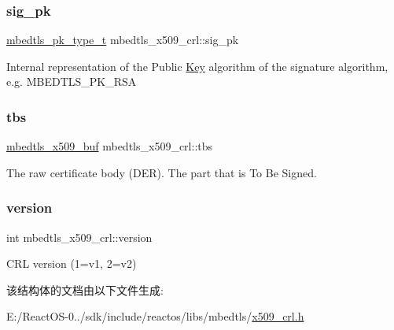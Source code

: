 \subsubsection{\texorpdfstring{sig\+\_\+pk}{sig\_pk}}
{\footnotesize\ttfamily \hyperlink{pk_8h_a3fe41eff5605ae727eb9d28dad297020}{mbedtls\+\_\+pk\+\_\+type\+\_\+t} mbedtls\+\_\+x509\+\_\+crl\+::sig\+\_\+pk}

Internal representation of the Public \hyperlink{struct_key}{Key} algorithm of the signature algorithm, e.\+g. M\+B\+E\+D\+T\+L\+S\+\_\+\+P\+K\+\_\+\+R\+SA \mbox{\label{structmbedtls__x509__crl_ab8086dd1a2a3d82363cc91e1cdfb5850}} 
\subsubsection{\texorpdfstring{tbs}{tbs}}
{\footnotesize\ttfamily \hyperlink{group__x509__module_ga4d02c9e8e4e2934555e0d132cd2976dc}{mbedtls\+\_\+x509\+\_\+buf} mbedtls\+\_\+x509\+\_\+crl\+::tbs}

The raw certificate body (D\+ER). The part that is To Be Signed. \mbox{\label{structmbedtls__x509__crl_aaf0d47225a63a5d9bf0e2e99d641e72d}} 
\subsubsection{\texorpdfstring{version}{version}}
{\footnotesize\ttfamily int mbedtls\+\_\+x509\+\_\+crl\+::version}

C\+RL version (1=v1, 2=v2) 

该结构体的文档由以下文件生成\+:\begin{DoxyCompactItemize}
\item 
E\+:/\+React\+O\+S-\/0../sdk/include/reactos/libs/mbedtls/\hyperlink{x509__crl_8h}{x509\+\_\+crl.\+h}\end{DoxyCompactItemize}
